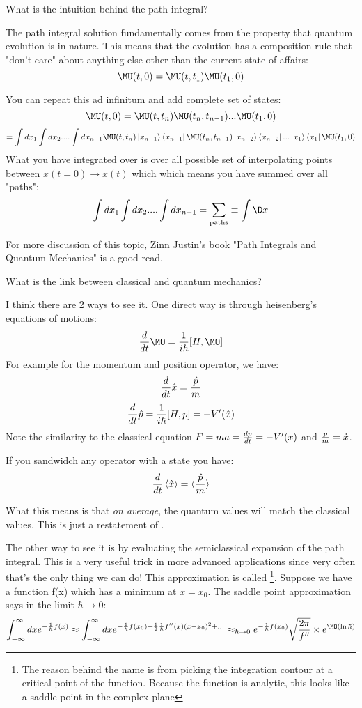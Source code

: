 \documentclass[10pt]{scrartcl}
\begin{document}
\begin{myquestion}
	What is the intuition behind the path integral?
	\end{myquestion}

The path integral solution fundamentally comes from the property that quantum evolution is  in nature.  This means that the evolution has a composition rule that "don't care" about anything else other than the current state of affairs:
\[\MU(t, 0) = \MU(t, t_1) \MU(t_1, 0)\]

You can repeat this ad infinitum and add complete set of states:
\[\MU(t, 0) = \MU(t, t_n) \MU(t_n, t_{n-1}) ... \MU(t_1, 0)\]
\[ =  \int dx_1 \int dx_2 .... \int d x_{n-1} \MU(t, t_n) \ket{x_{n-1}} \bra{x_{n-1}} \MU(t_n, t_{n-1}) \ket{x_{n-2}} \bra{x_{n-2}} ...  \ket{x_1} \bra{x_1}\MU(t_1, 0) \]
What you have integrated over is over all possible set of interpolating points between $x(t=0) \rightarrow x(t)$ which which means you have summed over all "paths":
\[\int dx_1 \int dx_2 .... \int d x_{n-1} = \sum_{\text{paths}} \equiv \int \D x \]

For more discussion of this topic, Zinn Justin's book "Path Integrals and Quantum Mechanics" is a good read.

\begin{myquestion}
	What is the link between classical and quantum mechanics?
	\end{myquestion}

I think there are 2 ways to see it.  One direct way is through heisenberg's equations of motions:
\[{d \over dt} \MO  = {1 \over i \hbar} [H, \MO] \]
For example for the momentum and position operator, we have:
\[{d \over dt} \hat{x} = {\hat{p} \over m} \]
\[{d \over dt} \hat{p} = {1 \over i \hbar} [H, p] = -V'(\hat{x}) \]
Note the similarity to the classical equation $F = ma = {dp \over dt} = - V'(x)$ and ${p \over m} = \dot{x}$.

If you sandwidch any operator with a state you have:
\[{d \over dt} \braket{\hat{x}} = \braket{\hat{p} \over m} \]

What this means is that \emph{on average}, the quantum values will match the classical values.  This is just a restatement of .

The other way to see it is by evaluating the semiclassical expansion of the path integral.  This is a very useful trick in more advanced applications since very often that's the only thing we can do!  This approximation is called  \footnote{The reason behind the name is from picking the integration contour at a critical point of the function.  Because the function is analytic, this looks like a saddle point in the complex plane}. Suppose we have a function f(x) which has a minimum at $x = x_0$.  The saddle point approximation says in the limit $\hbar \rightarrow 0$:
\[\int_{-\infty}^\infty dx e^{- {1 \over \hbar} f(x)} \approx \int_{-\infty}^\infty dx e^{ - {1 \over \hbar} f(x_0) + \frac12 {1 \over \hbar} f''(x) (x - x_0)^2 + ...} \approx_{\hbar \rightarrow 0} e^{- {1 \over \hbar} f(x_0)} \sqrt{ 2 \pi \over f''} \times e^{ \MO(\ln \hbar)}  \]
\end{document}
